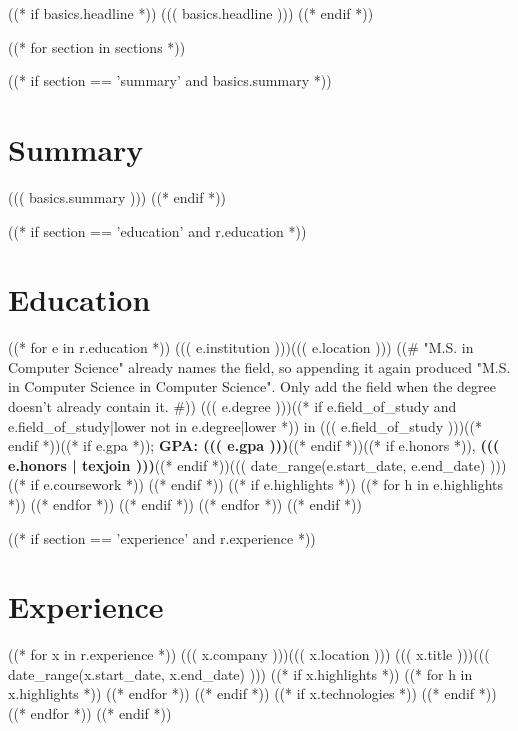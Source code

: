 ((* if basics.headline *))
\vspace{2pt}
{\small\color{muted}((( basics.headline )))}
((* endif *))

((* for section in sections *))

((* if section == 'summary' and basics.summary *))
\section{Summary}
\vspace{2pt}
{\small ((( basics.summary )))}
\vspace{-4pt}
((* endif *))

((* if section == 'education' and r.education *))
\section{Education}
  \resumeSubHeadingListStart
((* for e in r.education *))
    \resumeSubheading
      {((( e.institution )))}{((( e.location )))}
((# "M.S. in Computer Science" already names the field, so appending it again
    produced "M.S. in Computer Science in Computer Science". Only add the field
    when the degree doesn't already contain it. #))
      {((( e.degree )))((* if e.field_of_study and e.field_of_study|lower not in e.degree|lower *)) in ((( e.field_of_study )))((* endif *))((* if e.gpa *)); \textbf{GPA: ((( e.gpa )))}((* endif *))((* if e.honors *)), \textbf{((( e.honors | texjoin )))}((* endif *))}{((( date_range(e.start_date, e.end_date) )))}
((* if e.coursework *))
      \resumeItemListStart
      \resumeItemListEnd
((* endif *))
((* if e.highlights *))
      \resumeItemListStart
((* for h in e.highlights *))
((* endfor *))
      \resumeItemListEnd
((* endif *))
((* endfor *))
  \resumeSubHeadingListEnd
((* endif *))

((* if section == 'experience' and r.experience *))
\section{Experience}
  \resumeSubHeadingListStart
((* for x in r.experience *))
    \resumeSubheading
      {((( x.company )))}{((( x.location )))}
      {((( x.title )))}{((( date_range(x.start_date, x.end_date) )))}
((* if x.highlights *))
      \resumeItemListStart
((* for h in x.highlights *))
((* endfor *))
      \resumeItemListEnd
((* endif *))
((* if x.technologies *))
      \resumeItemListStart
      \resumeItemListEnd
((* endif *))
((* endfor *))
  \resumeSubHeadingListEnd
((* endif *))

